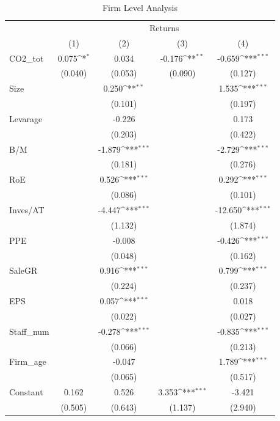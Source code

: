 \documentclass[12pt]{article}
\begin{document}
\begin{table}[H]
\centering
\footnotesize
\caption{Firm Level Analysis}
\label{tab: firm_level}
{
\def\sym#1{\ifmmode^{#1}\else\(^{#1}\)\fi}
\begin{tabular}{@{\extracolsep{2pt}}l*{4}{c}@{}}
\toprule
& \multicolumn{4}{c}{Returns} \\
\cline{2-5}
 & (1) & (2) & (3) & (4) \\
\hline
CO2\_tot & 0.075\sym{*} & 0.034 & -0.176\sym{**} & -0.659\sym{***} \\
 & (0.040) & (0.053) & (0.090) & (0.127) \\
Size &  & 0.250\sym{**} &  & 1.535\sym{***} \\
 &  & (0.101) &  & (0.197) \\
Levarage &  & -0.226 &  & 0.173 \\
 &  & (0.203) &  & (0.422) \\
B/M &  & -1.879\sym{***} &  & -2.729\sym{***} \\
 &  & (0.181) &  & (0.276) \\
RoE &  & 0.526\sym{***} &  & 0.292\sym{***} \\
 &  & (0.086) &  & (0.101) \\
Inves/AT &  & -4.447\sym{***} &  & -12.650\sym{***} \\
 &  & (1.132) &  & (1.874) \\
PPE &  & -0.008 &  & -0.426\sym{***} \\
 &  & (0.048) &  & (0.162) \\
SaleGR &  & 0.916\sym{***} &  & 0.799\sym{***} \\
 &  & (0.224) &  & (0.237) \\
EPS &  & 0.057\sym{***} &  & 0.018 \\
 &  & (0.022) &  & (0.027) \\
Staff\_num &  & -0.278\sym{***} &  & -0.835\sym{***} \\
 &  & (0.066) &  & (0.213) \\
Firm\_age &  & -0.047 &  & 1.789\sym{***} \\
 &  & (0.065) &  & (0.517) \\
Constant & 0.162 & 0.526 & 3.353\sym{***} & -3.421 \\
 & (0.505) & (0.643) & (1.137) & (2.940) \\


\end{tabular}}
\end{table}
\end{document}
